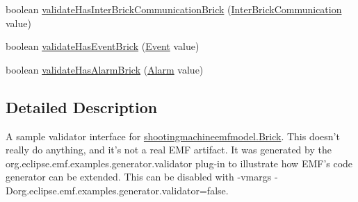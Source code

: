 \begin{DoxyCompactItemize}
\item 
boolean \hyperlink{interfaceshootingmachineemfmodel_1_1validation_1_1_brick_validator_ac8dd231522c7c69bba3cf5fd3ed4f9a1}{validate\-Has\-Inter\-Brick\-Communication\-Brick} (\hyperlink{interfaceshootingmachineemfmodel_1_1_inter_brick_communication}{Inter\-Brick\-Communication} value)
\item 
boolean \hyperlink{interfaceshootingmachineemfmodel_1_1validation_1_1_brick_validator_a0e02576254b87ed81e15483bb1189eab}{validate\-Has\-Event\-Brick} (\hyperlink{interfaceshootingmachineemfmodel_1_1_event}{Event} value)
\item 
boolean \hyperlink{interfaceshootingmachineemfmodel_1_1validation_1_1_brick_validator_af3381046983903e10350f5680b06878d}{validate\-Has\-Alarm\-Brick} (\hyperlink{interfaceshootingmachineemfmodel_1_1_alarm}{Alarm} value)
\end{DoxyCompactItemize}


\subsection{Detailed Description}
A sample validator interface for \hyperlink{interfaceshootingmachineemfmodel_1_1_brick}{shootingmachineemfmodel.\-Brick}. This doesn't really do anything, and it's not a real E\-M\-F artifact. It was generated by the org.\-eclipse.\-emf.\-examples.\-generator.\-validator plug-\/in to illustrate how E\-M\-F's code generator can be extended. This can be disabled with -\/vmargs -\/\-Dorg.\-eclipse.\-emf.\-examples.\-generator.\-validator=false. 

